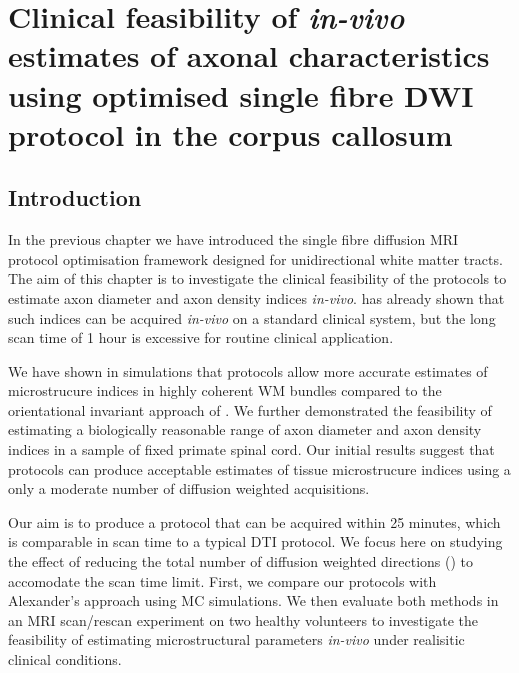 \chapter{Clinical feasibility of \textit{in-vivo} estimates of axonal characteristics using optimised single fibre DWI protocol in the corpus callosum}
\label{chapter 8}
\section{Introduction}
In the previous chapter we have introduced the single fibre \SF{} diffusion MRI protocol optimisation framework designed for unidirectional white matter tracts. The aim of this chapter is to investigate the clinical feasibility of the \SF{} protocols to estimate axon diameter and axon density indices \emph{in-vivo}.  has already shown that such indices can be acquired \emph{in-vivo} on a standard clinical system, but the long scan time of 1 hour is excessive for routine clinical application.  


We have shown in simulations that \SF{} protocols allow more accurate estimates of microstrucure indices in highly coherent WM bundles compared to the orientational invariant \OI{} approach of \citep{Alexander:2008}. We further demonstrated the feasibility of estimating a biologically reasonable range of axon diameter and axon density indices in a sample of fixed primate spinal cord. Our initial results suggest that \SF{} protocols can produce acceptable estimates of tissue microstrucure indices using a only a moderate number of diffusion weighted acquisitions. 

Our aim is to produce a \SF{} protocol that can be acquired within 25 minutes, which is comparable in scan time to a typical DTI protocol. We focus here on studying the effect of reducing the total number of diffusion weighted directions (\SF{}) to accomodate the scan time limit. First, we compare our \SF{} protocols with Alexander's \OI{} approach using \gls{MC} simulations. We then evaluate both methods in an MRI scan/rescan experiment on two healthy volunteers to investigate the feasibility of estimating microstructural parameters \emph{in-vivo} under realisitic clinical conditions.

